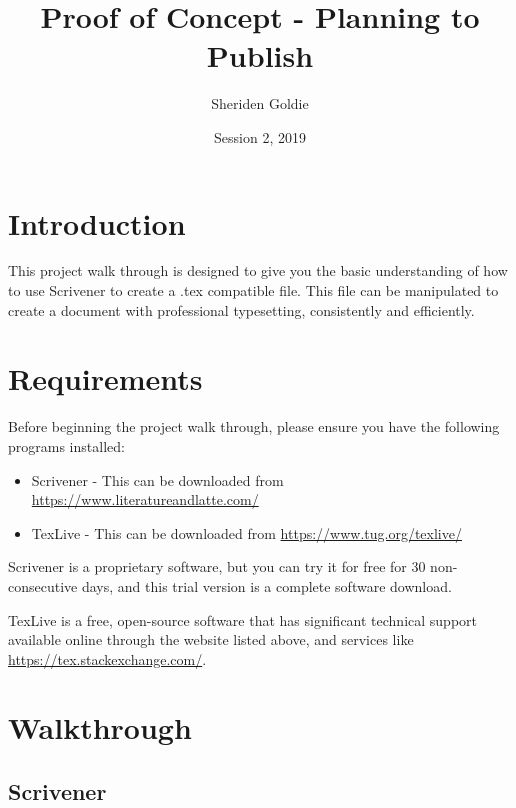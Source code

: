 \documentclass{article}
\title{Proof of Concept - Planning to Publish}
\author{Sheriden Goldie}
\date{Session 2, 2019}
\begin{document}
\maketitle

\tableofcontents

\pagebreak

\section{Introduction}

This project walk through is designed to give you the basic understanding of how to use Scrivener to create a .tex compatible file. This file can be manipulated to create a document with professional typesetting, consistently and efficiently. 

\section{Requirements}

Before beginning the project walk through, please ensure you have the following programs installed:

\begin{itemize}
    \item Scrivener - This can be downloaded from \url{https://www.literatureandlatte.com/}
    \item TexLive - This can be downloaded from \url{https://www.tug.org/texlive/}
\end{itemize}

Scrivener is a proprietary software, but you can try it for free for 30 non-consecutive days, and this trial version is a complete software download. 

TexLive is a free, open-source software that has significant technical support available online through the website listed above, and services like \url{https://tex.stackexchange.com/}.

\section{Walkthrough}

\subsection{Scrivener}
\end{document}
